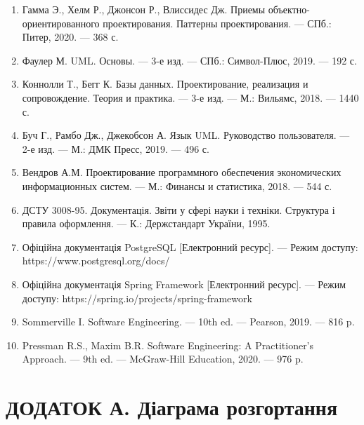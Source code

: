 \documentclass[14pt,a4paper]{extarticle}
\begin{document}
\begin{enumerate}
    \item Гамма Э., Хелм Р., Джонсон Р., Влиссидес Дж. Приемы объектно-ориентированного проектирования. Паттерны проектирования. --- СПб.: Питер, 2020. --- 368 с.
    
    \item Фаулер М. UML. Основы. --- 3-е изд. --- СПб.: Символ-Плюс, 2019. --- 192 с.
    
    \item Коннолли Т., Бегг К. Базы данных. Проектирование, реализация и сопровождение. Теория и практика. --- 3-е изд. --- М.: Вильямс, 2018. --- 1440 с.
    
    \item Буч Г., Рамбо Дж., Джекобсон А. Язык UML. Руководство пользователя. --- 2-е изд. --- М.: ДМК Пресс, 2019. --- 496 с.
    
    \item Вендров А.М. Проектирование программного обеспечения экономических информационных систем. --- М.: Финансы и статистика, 2018. --- 544 с.
    
    \item ДСТУ 3008-95. Документація. Звіти у сфері науки і техніки. Структура і правила оформлення. --- К.: Держстандарт України, 1995.
    
    \item Офіційна документація PostgreSQL [Електронний ресурс]. --- Режим доступу: https://www.postgresql.org/docs/
    
    \item Офіційна документація Spring Framework [Електронний ресурс]. --- Режим доступу: https://spring.io/projects/spring-framework
    
    \item Sommerville I. Software Engineering. --- 10th ed. --- Pearson, 2019. --- 816 p.
    
    \item Pressman R.S., Maxim B.R. Software Engineering: A Practitioner's Approach. --- 9th ed. --- McGraw-Hill Education, 2020. --- 976 p.
\end{enumerate}

\newpage
\appendix
\section{ДОДАТОК А. Діаграма розгортання}
\end{document}
